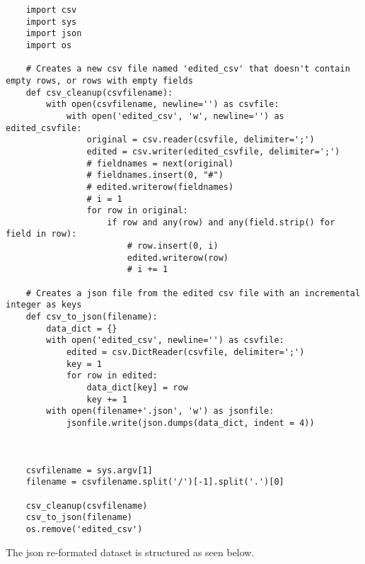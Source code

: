 \begin{verbatim}
    import csv
    import sys
    import json
    import os

    # Creates a new csv file named 'edited_csv' that doesn't contain empty rows, or rows with empty fields
    def csv_cleanup(csvfilename):
        with open(csvfilename, newline='') as csvfile:
            with open('edited_csv', 'w', newline='') as edited_csvfile:
                original = csv.reader(csvfile, delimiter=';')
                edited = csv.writer(edited_csvfile, delimiter=';')
                # fieldnames = next(original)
                # fieldnames.insert(0, "#")
                # edited.writerow(fieldnames)
                # i = 1
                for row in original:
                    if row and any(row) and any(field.strip() for field in row):
                        # row.insert(0, i)
                        edited.writerow(row)
                        # i += 1

    # Creates a json file from the edited csv file with an incremental integer as keys
    def csv_to_json(filename):
        data_dict = {}
        with open('edited_csv', newline='') as csvfile:
            edited = csv.DictReader(csvfile, delimiter=';')
            key = 1
            for row in edited: 
                data_dict[key] = row
                key += 1
        with open(filename+'.json', 'w') as jsonfile:
            jsonfile.write(json.dumps(data_dict, indent = 4))



    csvfilename = sys.argv[1]
    filename = csvfilename.split('/')[-1].split('.')[0]

    csv_cleanup(csvfilename)
    csv_to_json(filename)
    os.remove('edited_csv')
\end{verbatim}

The json re-formated dataset is structured as seen below.

